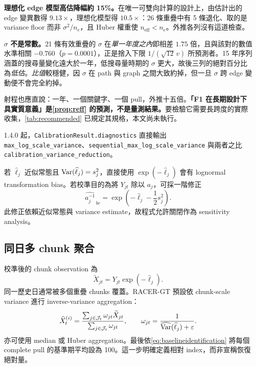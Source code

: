 \documentclass[12pt,a4paper,oneside]{article}
\begin{document}
\begin{remark}[這使 F1 成為可在設計階段計算的量]
\begin{remark}
\textbf{理想化 edge 模型高估降幅約 15\%。}在唯一可雙向計算的設計上，由估計出的 edge 變異數得 $9.13\times$，理想化模型得 $10.5\times$：26 條重疊中有 5 條退化、取的是 variance floor 而非 $\sigma^2/n_e$，且 Huber 權重使 $n_{\mathrm{eff}}<n_e$。外推各列沒有這道檢查。

\textbf{$\sigma$ 不是常數。}21 條有效重疊的 $\sigma$ 在\emph{單一年度之內}即相差 $1.75$ 倍，且與該對的數值水準相關 $-0.760$（$p=0.0001$），正是捨入下限 $1/(\sqrt{12}\,v)$ 所預測者。15 年序列涵蓋的搜尋量變化遠大於一年，低搜尋量時期的 $\sigma$ 更大，故後三列的絕對百分比為\emph{低估}。\emph{比值}較穩健，因 $\sigma$ 在 path 與 graph 之間大致約掉，但一旦 $\sigma$ 跨 edge 變動便不會完全約掉。

射程也應直說：一年、一個關鍵字、一個 pull，外推十五倍。\textbf{「F1 在長期設計下具實質意義」是\cref{prop:reff} 的預測，不是量測結果。}要檢驗它需要長跨度的實際收集，\cref{tab:recommended} 已規定其規格，本文尚未執行。
\end{remark}

1.4.0 起，\texttt{CalibrationResult.diagnostics} 直接輸出 \texttt{max\_\allowbreak log\_\allowbreak scale\_\allowbreak variance}、\texttt{sequential\_\allowbreak max\_\allowbreak log\_\allowbreak scale\_\allowbreak variance} 與兩者之比 \texttt{calibration\_\allowbreak variance\_\allowbreak reduction}。
\end{remark}

若 $\widehat\ell_j$ 近似常態且 $\operatorname{Var}(\widehat\ell_j)=s_j^2$，直接使用 $\exp(-\widehat\ell_j)$ 會有 lognormal transformation bias。若校準目的為將 $Y_{jt}$ 除以 $a_j$，可採一階修正
\begin{equation}
\widehat{a_j^{-1}}_{\,bc}
=\exp\left(-\widehat\ell_j-\frac{1}{2}s_j^2\right).
\label{eq:lognormalcorrection}
\end{equation}
此修正依賴近似常態與 variance estimate，故程式允許關閉作為 sensitivity analysis。

\subsection{同日多 chunk 聚合}

校準後的 chunk observation 為
\begin{equation}
\widetilde X_{jt}=Y_{jt}\exp(-\widehat\ell_j).
\end{equation}
同一歷史日通常被多個重疊 chunks 覆蓋。RACER-GT 預設依 chunk-scale variance 進行 inverse-variance aggregation：
\begin{equation}
\widehat X^{(i)}_t
=\frac{\sum_{j\in\mathcal{J}_t}\omega_{jt}\widetilde X_{jt}}
{\sum_{j\in\mathcal{J}_t}\omega_{jt}},
\qquad
\omega_{jt}=\frac{1}{\widehat{\operatorname{Var}}(\widehat\ell_j)+\varepsilon}.
\end{equation}
亦可使用 median 或 Huber aggregation。最後依\cref{eq:baselineidentification} 將每個 complete pull 的基準期平均設為 100。這一步明確定義相對 index，而非宣稱恢復絕對量。
\end{document}
